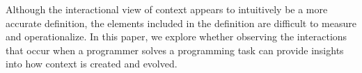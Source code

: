 Although the interactional view of context appears to intuitively be a more accurate definition, the elements included in the definition are difficult to measure and operationalize. In this paper, we explore whether observing the interactions that occur when a programmer solves a programming task can provide insights into how context is created and evolved. 
